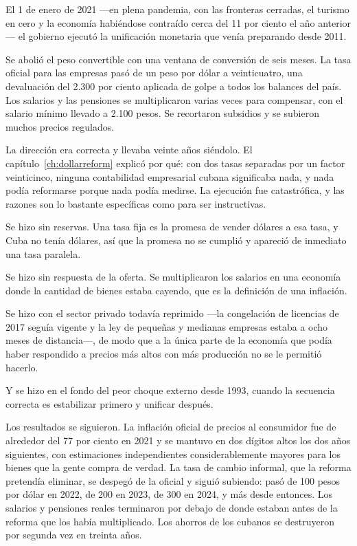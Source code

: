 El 1 de enero de 2021 ---en plena pandemia, con las fronteras cerradas, el turismo
en cero y la economía habiéndose contraído cerca del 11 por ciento el año
anterior--- el gobierno ejecutó la unificación monetaria que venía preparando desde
2011.

Se abolió el peso convertible con una ventana de conversión de seis meses. La tasa
oficial para las empresas pasó de un peso por dólar a veinticuatro, una devaluación
del 2.300 por ciento aplicada de golpe a todos los balances del país. Los salarios
y las pensiones se multiplicaron varias veces para compensar, con el salario mínimo
llevado a 2.100 pesos. Se recortaron subsidios y se subieron muchos precios
regulados.

La dirección era correcta y llevaba veinte años siéndolo. El
capítulo~\ref{ch:dollarreform} explicó por qué: con dos tasas separadas por un
factor veinticinco, ninguna contabilidad empresarial cubana significaba nada, y
nada podía reformarse porque nada podía medirse. La ejecución fue catastrófica, y
las razones son lo bastante específicas como para ser instructivas.

Se hizo sin reservas. Una tasa fija es la promesa de vender dólares a esa tasa, y
Cuba no tenía dólares, así que la promesa no se cumplió y apareció de inmediato una
tasa paralela.

Se hizo sin respuesta de la oferta. Se multiplicaron los salarios en una economía
donde la cantidad de bienes estaba cayendo, que es la definición de una inflación.

Se hizo con el sector privado todavía reprimido ---la congelación de licencias de
2017 seguía vigente y la ley de pequeñas y medianas empresas estaba a ocho meses de
distancia---, de modo que a la única parte de la economía que podía haber respondido
a precios más altos con más producción no se le permitió hacerlo.

Y se hizo en el fondo del peor choque externo desde 1993, cuando la secuencia
correcta es estabilizar primero y unificar después.

Los resultados se siguieron. La inflación oficial de precios al consumidor fue de
alrededor del 77 por ciento en 2021 y se mantuvo en dos dígitos altos los dos años
siguientes, con estimaciones independientes considerablemente mayores para los
bienes que la gente compra de verdad.\unv{} La tasa de cambio informal, que la
reforma pretendía eliminar, se despegó de la oficial y siguió subiendo: pasó de 100
pesos por dólar en 2022, de 200 en 2023, de 300 en 2024, y más desde
entonces.\unv{} Los salarios y pensiones reales terminaron por debajo de donde
estaban antes de la reforma que los había multiplicado. Los ahorros de los cubanos
se destruyeron por segunda vez en treinta años.

